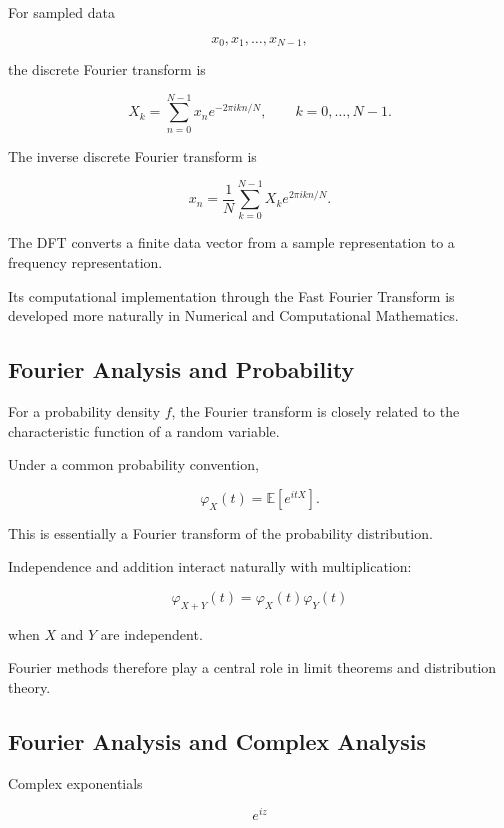 For sampled data

\[
x_0,x_1,\ldots,x_{N-1},
\]

the discrete Fourier transform is

\[
\boxed{
X_k
=
\sum_{n=0}^{N-1}
x_n
e^{-2\pi i kn/N},
\qquad
k=0,\ldots,N-1.
}
\]

The inverse discrete Fourier transform is

\[
\boxed{
x_n
=
\frac1N
\sum_{k=0}^{N-1}
X_k
e^{2\pi i kn/N}.
}
\]

The DFT converts a finite data vector from a sample representation to a
frequency representation.

Its computational implementation through the Fast Fourier Transform is
developed more naturally in Numerical and Computational Mathematics.

\subsection{Fourier Analysis and Probability}
\label{subsec:fourier-probability}

For a probability density \(f\), the Fourier transform is closely related
to the characteristic function of a random variable.

Under a common probability convention,

\[
\boxed{
\varphi_X(t)
=
\mathbb{E}[e^{itX}].
}
\]

This is essentially a Fourier transform of the probability distribution.

Independence and addition interact naturally with multiplication:

\[
\boxed{
\varphi_{X+Y}(t)
=
\varphi_X(t)\varphi_Y(t)
}
\]

when \(X\) and \(Y\) are independent.

Fourier methods therefore play a central role in limit theorems and
distribution theory.

\subsection{Fourier Analysis and Complex Analysis}
\label{subsec:fourier-complex-analysis}

Complex exponentials

\[
e^{iz}
\]

